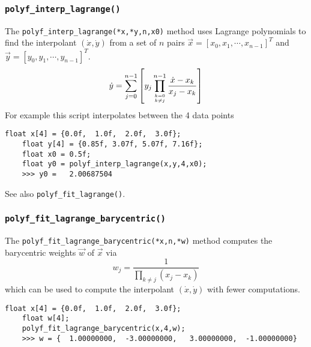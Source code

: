 \subsubsection{{\tt polyf\_interp\_lagrange()}}
\label{module:math:poly:polyf_interp_lagrange}
The {\tt polyf\_interp\_lagrange(*x,*y,n,x0)} method
uses Lagrange polynomials to find the interpolant
$(\dot{x},\dot{y})$ from a set of $n$ pairs
$\vec{x}=[x_0,x_1,\cdots,x_{n-1}]^T$ and 
$\vec{y}=[y_0,y_1,\cdots,y_{n-1}]^T$.
%
\begin{equation}
\label{eqn:math:poly:polyinterp_lagrange}
    \dot{y} =
        \sum_{j=0}^{n-1} {
            \left[
            y_j
            \prod_{{k=0}\atop{k \ne j}}^{n-1} {
                \frac{\dot{x}-x_k}{x_j-x_k}
            }
            \right]
        }
\end{equation}
%
For example this script interpolates between the 4 data points
%
\begin{Verbatim}[fontsize=\small]
    float x[4] = {0.0f,  1.0f,  2.0f,  3.0f};
    float y[4] = {0.85f, 3.07f, 5.07f, 7.16f};
    float x0 = 0.5f;
    float y0 = polyf_interp_lagrange(x,y,4,x0);
    >>> y0 =   2.00687504
\end{Verbatim}
%
See also {\tt polyf\_fit\_lagrange()}.

\subsubsection{{\tt polyf\_fit\_lagrange\_barycentric()}}
\label{module:math:poly:polyf_fit_lagrange_barycentric}
The {\tt polyf\_fit\_lagrange\_barycentric(*x,n,*w)} method
computes the barycentric weights $\vec{w}$ of $\vec{x}$ via
%
\begin{equation}
\label{eqn:math:poly:polyfit_lagrange_barycentric}
    w_j =   \frac{1}{
                \prod_{k \ne j}{\left(x_j - x_k\right)}
            }
\end{equation}
%
which can be used to compute the interpolant $(\dot{x},\dot{y})$
with fewer computations.
%
\begin{Verbatim}[fontsize=\small]
    float x[4] = {0.0f,  1.0f,  2.0f,  3.0f};
    float w[4];
    polyf_fit_lagrange_barycentric(x,4,w);
    >>> w = {  1.00000000,  -3.00000000,   3.00000000,  -1.00000000}
\end{Verbatim}
%

